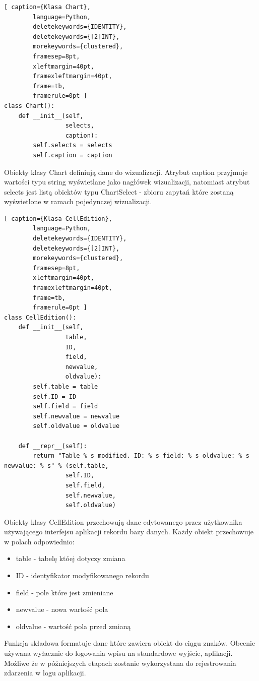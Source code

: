 \documentclass[a4paper,10pt, twoside]{report}
\begin{document}
\begin{minipage}{\textwidth}
    \begin{lstlisting}[ caption={Klasa Chart},
        language=Python,
        deletekeywords={IDENTITY},
        deletekeywords={[2]INT},
        morekeywords={clustered},
        framesep=8pt,
        xleftmargin=40pt,
        framexleftmargin=40pt,
        frame=tb,
        framerule=0pt ]
class Chart():
    def __init__(self,
                 selects,
                 caption):
        self.selects = selects
        self.caption = caption
    \end{lstlisting}
{Obiekty klasy Chart definiują dane do wizualizacji. Atrybut caption przyjmuje 
wartości typu string wyświetlane jako nagłówek wizualizacji, natomiast atrybut 
selects jest listą obiektów typu ChartSelect - zbioru zapytań które zostaną 
wyświetlone w ramach pojedynczej wizualizacji.}
\end{minipage}

\label{Classes-CellEdition}
\begin{minipage}{\textwidth}
    \begin{lstlisting}[ caption={Klasa CellEdition},
        language=Python,
        deletekeywords={IDENTITY},
        deletekeywords={[2]INT},
        morekeywords={clustered},
        framesep=8pt,
        xleftmargin=40pt,
        framexleftmargin=40pt,
        frame=tb,
        framerule=0pt ]
class CellEdition():
    def __init__(self,
                 table, 
                 ID, 
                 field, 
                 newvalue,
                 oldvalue): 
        self.table = table
        self.ID = ID
        self.field = field
        self.newvalue = newvalue
        self.oldvalue = oldvalue

    def __repr__(self): 
        return "Table % s modified. ID: % s field: % s oldvalue: % s newvalue: % s" % (self.table, 
                 self.ID, 
                 self.field, 
                 self.newvalue,
                 self.oldvalue)
    \end{lstlisting}
{Obiekty klasy CellEdition przechowują dane edytowanego przez użytkownika 
używającego interfejsu aplikacji rekordu bazy danych. Każdy obiekt przechowuje w
 polach odpowiednio:}
\begin{itemize}
    \item table - tabelę któej dotyczy zmiana
    \item ID - identyfikator modyfikowanego rekordu
    \item field - pole które jest zmieniane
    \item newvalue - nowa wartość pola
    \item oldvalue - wartość pola przed zmianą
\end{itemize}
{Funkcja składowa  formatuje dane które zawiera obiekt 
do ciągu znaków. Obecnie używana wyłacznie do logowania wpisu na standardowe 
wyjście, aplikacji. Możliwe że w późniejszych etapach zostanie wykorzystana do 
rejestrowania zdarzenia w logu aplikacji.}
\end{minipage}
\end{document}
